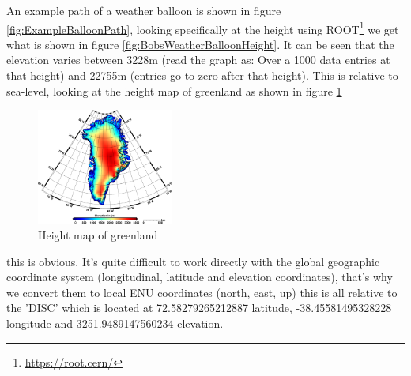 \documentclass[11pt,a4paper,faculty=we,language=en,doctype=report]{cls/ugent-doc}
\begin{document}
An example path of a weather balloon is shown in figure
\ref{fig:ExampleBalloonPath}, looking specifically at the height using ROOT\footnote{\url{https://root.cern/}}
we get what is shown in figure \ref{fig:BobsWeatherBalloonHeight}. It can be seen that the elevation varies between 3228m 
(read the graph as: Over a 1000 data entries at that height)
and 22755m (entries go to zero after that height). 
This is relative to sea-level, looking at the height map of greenland as shown in figure \ref{fig:HeightMapGreenland}
\begin{figure}
  \centering
  \includegraphics[width=0.4\textwidth]{GreenlandHeight.png}
  \caption{Height map of greenland}
  \label{fig:HeightMapGreenland}
\end{figure}
this is obvious.  It's quite difficult to work directly with the global geographic
coordinate system (longitudinal, latitude and elevation coordinates),
that's why we convert them to local ENU coordinates (north, east, up) this is all
relative to the 'DISC' which is located at 72.58279265212887 latitude,
-38.45581495328228 longitude and 3251.9489147560234 elevation.
\end{document}
